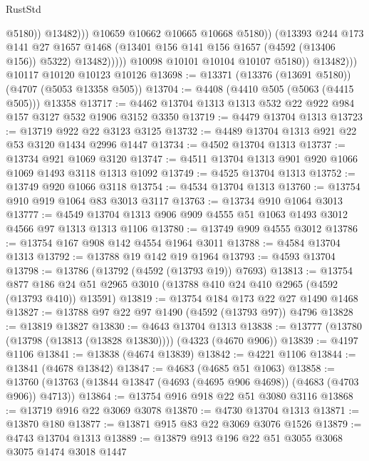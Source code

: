 \begin{lexlean}{RustStd}
\begin{coremodule}
                                    @5180))
                                @13482)))
                          @10659
                          @10662
                          @10665
                          @10668
                          @5180))
                      (@13393
                        @244
                        @173
                        @141
                        @27
                        @1657
                        @1468
                        (@13401 @156 @141 @156 @1657 (@4592 (@13406 @156)) @5322)
                        @13482)))))
              @10098
              @10101
              @10104
              @10107
              @5180))
          @13482)))
    @10117
    @10120
    @10123
    @10126
@13698 := @13371 (@13376 (@13691 @5180)) (@4707 (@5053 @13358 @505))
@13704 := @4408 (@4410 @505 (@5063 (@4415 @505))) @13358
@13717 := @4462 @13704 @1313 @1313 @532 @22 @922 @984 @157 @3127 @532 @1906 @3152 @3350
@13719 := @4479 @13704 @1313
@13723 := @13719 @922 @22 @3123 @3125
@13732 := @4489 @13704 @1313 @921 @22 @53 @3120 @1434 @2996 @1447
@13734 := @4502 @13704 @1313
@13737 := @13734 @921 @1069 @3120
@13747 := @4511 @13704 @1313 @901 @920 @1066 @1069 @1493 @3118 @1313 @1092
@13749 := @4525 @13704 @1313
@13752 := @13749 @920 @1066 @3118
@13754 := @4534 @13704 @1313
@13760 := @13754 @910 @919 @1064 @83 @3013 @3117
@13763 := @13734 @910 @1064 @3013
@13777 := @4549 @13704 @1313 @906 @909 @4555 @51 @1063 @1493 @3012 @4566 @97 @1313 @1313 @1106
@13780 := @13749 @909 @4555 @3012
@13786 := @13754 @167 @908 @142 @4554 @1964 @3011
@13788 := @4584 @13704 @1313
@13792 := @13788 @19 @142 @19 @1964
@13793 := @4593 @13704
@13798 := @13786 (@13792 (@4592 (@13793 @19)) @7693)
@13813 := @13754
    @877
    @186
    @24
    @51
    @2965
    @3010
    (@13788 @410 @24 @410 @2965 (@4592 (@13793 @410)) @13591)
@13819 := @13754 @184 @173 @22 @27 @1490 @1468
@13827 := @13788 @97 @22 @97 @1490 (@4592 (@13793 @97)) @4796
@13828 := @13819 @13827
@13830 := @4643 @13704 @1313
@13838 := @13777 (@13780 (@13798 (@13813 (@13828 @13830)))) (@4323 (@4670 @906))
@13839 := @4197 @1106
@13841 := @13838 (@4674 @13839)
@13842 := @4221 @1106
@13844 := @13841 (@4678 @13842)
@13847 := @4683 (@4685 @51 @1063)
@13858 := @13760 (@13763 (@13844 @13847 (@4693 (@4695 @906 @4698)) (@4683 (@4703 @906)) @4713))
@13864 := @13754 @916 @918 @22 @51 @3080 @3116
@13868 := @13719 @916 @22 @3069 @3078
@13870 := @4730 @13704 @1313
@13871 := @13870 @180
@13877 := @13871 @915 @83 @22 @3069 @3076 @1526
@13879 := @4743 @13704 @1313
@13889 := @13879 @913 @196 @22 @51 @3055 @3068 @3075 @1474 @3018 @1447

\end{coremodule}
\end{lexlean}
